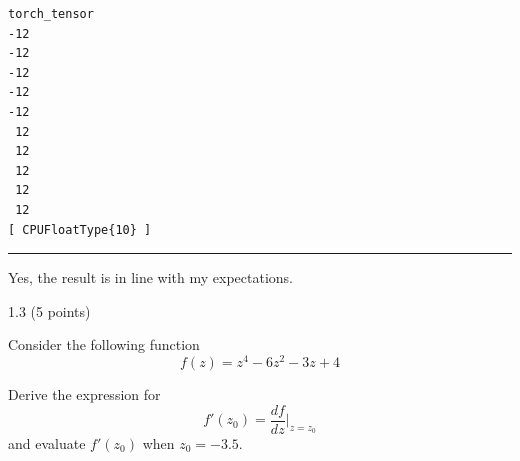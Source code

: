 \documentclass[
  letterpaper,
  DIV=11,
  numbers=noendperiod]{scrartcl}
\newenvironment{Shaded}{\begin{snugshade}}{\end{snugshade}}
\newcommand{\AttributeTok}[1]{\textcolor[rgb]{0.40,0.45,0.13}{#1}}
\newcommand{\ConstantTok}[1]{\textcolor[rgb]{0.56,0.35,0.01}{#1}}
\newcommand{\ControlFlowTok}[1]{\textcolor[rgb]{0.00,0.23,0.31}{#1}}
\newcommand{\DecValTok}[1]{\textcolor[rgb]{0.68,0.00,0.00}{#1}}
\newcommand{\FunctionTok}[1]{\textcolor[rgb]{0.28,0.35,0.67}{#1}}
\newcommand{\NormalTok}[1]{\textcolor[rgb]{0.00,0.23,0.31}{#1}}
\newcommand{\OtherTok}[1]{\textcolor[rgb]{0.00,0.23,0.31}{#1}}
\newcommand{\SpecialCharTok}[1]{\textcolor[rgb]{0.37,0.37,0.37}{#1}}
\begin{document}
\begin{Shaded}
\end{Shaded}

\begin{verbatim}
torch_tensor
-12
-12
-12
-12
-12
 12
 12
 12
 12
 12
[ CPUFloatType{10} ]
\end{verbatim}

\begin{center}\rule{0.5\linewidth}{0.5pt}\end{center}

Yes, the result is in line with my expectations.

1.3 (5 points)

Consider the following function \[
f(z) = z^4 - 6z^2 - 3z + 4
\]

Derive the expression for \[
f'(z_0) = \frac{df}{dz}\Bigg|_{z=z_0}
\] and evaluate \(f'(z_0)\) when \(z_0 = -3.5\).
\end{document}
